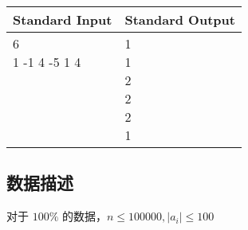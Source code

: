 \begin{table}[H]
\begin{tabularx}{\textwidth}{|X|X|}
    \hline
    \textbf{Standard Input} & \textbf{Standard Output} \\ 
    \hline 
    \tablecell{
        6 \\
        1 -1 4 -5 1 4 \\ \\ \\ \\ \\
    } & 
    \tablecell{
    1 \\
    1 \\
    2 \\
    2 \\
    2 \\
    1 \\
    } \\
    \hline
\end{tabularx}
\end{table}
\subsection*{数据描述}
对于 $100\%$ 的数据，$n \le 100000 , |a_i| \le 100$